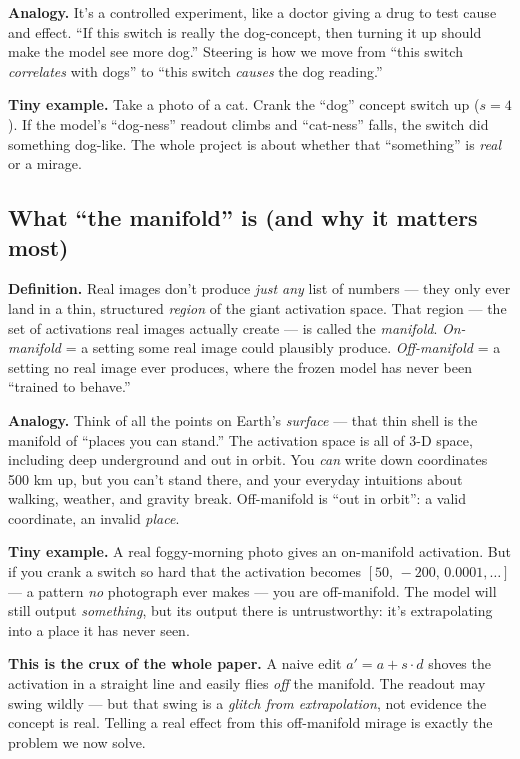 \documentclass[12pt]{article}
\newcommand{\dlabel}[1]{\textbf{\textcolor{accent}{#1}}\;}
\begin{document}
\dlabel{Analogy.} It's a controlled experiment, like a doctor giving a drug to test cause and effect. ``If this switch is really the dog-concept, then turning it up should make the model see more dog.'' Steering is how we move from ``this switch \emph{correlates} with dogs'' to ``this switch \emph{causes} the dog reading.''

\dlabel{Tiny example.} Take a photo of a cat. Crank the ``dog'' concept switch up ($s = 4$). If the model's ``dog-ness'' readout climbs and ``cat-ness'' falls, the switch did something dog-like. The whole project is about whether that ``something'' is \emph{real} or a mirage.

\subsection{What ``the manifold'' is (and why it matters most)}

\dlabel{Definition.} Real images don't produce \emph{just any} list of numbers --- they only ever land in a thin, structured \emph{region} of the giant activation space. That region --- the set of activations real images actually create --- is called the \emph{manifold}. \emph{On-manifold} = a setting some real image could plausibly produce. \emph{Off-manifold} = a setting no real image ever produces, where the frozen model has never been ``trained to behave.''

\dlabel{Analogy.} Think of all the points on Earth's \emph{surface} --- that thin shell is the manifold of ``places you can stand.'' The activation space is all of 3-D space, including deep underground and out in orbit. You \emph{can} write down coordinates 500 km up, but you can't stand there, and your everyday intuitions about walking, weather, and gravity break. Off-manifold is ``out in orbit'': a valid coordinate, an invalid \emph{place}.

\dlabel{Tiny example.} A real foggy-morning photo gives an on-manifold activation. But if you crank a switch so hard that the activation becomes $[50,\,-200,\,0.0001,\dots]$ --- a pattern \emph{no} photograph ever makes --- you are off-manifold. The model will still output \emph{something}, but its output there is untrustworthy: it's extrapolating into a place it has never seen.

\begin{keybox}
\textbf{This is the crux of the whole paper.} A naive edit $a' = a + s\cdot d$ shoves the activation in a straight line and easily flies \emph{off} the manifold. The readout may swing wildly --- but that swing is a \emph{glitch from extrapolation}, not evidence the concept is real. Telling a real effect from this off-manifold mirage is exactly the problem we now solve.
\end{keybox}
\end{document}
